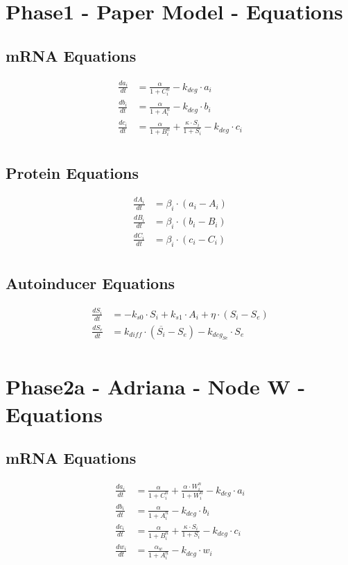 \documentclass[fleqn]{article}
\begin{document}
\section*{Phase1 - Paper Model - Equations}

\subsection*{mRNA Equations}
\begin{align*}
\frac{da_i}{dt} &= \frac{\alpha}{1 + C_i^n} - k_{deg} \cdot a_i \\
\frac{db_i}{dt} &= \frac{\alpha}{1 + A_i^n} - k_{deg} \cdot b_i \\
\frac{dc_i}{dt} &= \frac{\alpha}{1 + B_i^n} + \frac{\kappa \cdot S_i}{1 + S_i} - k_{deg} \cdot c_i \\
\end{align*}

\subsection*{Protein Equations}
\begin{align*}
\frac{dA_i}{dt} &= \beta_i \cdot (a_i - A_i) \\
\frac{dB_i}{dt} &= \beta_i \cdot (b_i - B_i) \\
\frac{dC_i}{dt} &= \beta_i \cdot (c_i - C_i) \\
\end{align*}

\subsection*{Autoinducer Equations}
\begin{align*}
\frac{dS_i}{dt} &= -k_{s0} \cdot S_i + k_{s1} \cdot A_i + \eta \cdot (S_i - S_e) \\
\frac{dS_e}{dt} &= k_{diff} \cdot (\overline{S_i} - S_e) - k_{deg_{Se}} \cdot S_e \\
\end{align*}

\pagebreak

\section*{Phase2a - Adriana - Node W - Equations}

\subsection*{mRNA Equations}
\begin{align*}
\frac{da_i}{dt} &= \frac{\alpha}{1 + C_i^n} +  \frac{\alpha \cdot W_i^n}{1 + W_i^n} - k_{deg} \cdot a_i \\
\frac{db_i}{dt} &= \frac{\alpha}{1 + A_i^n} - k_{deg} \cdot b_i \\
\frac{dc_i}{dt} &= \frac{\alpha}{1 + B_i^n} + \frac{\kappa \cdot S_i}{1 + S_i} - k_{deg} \cdot c_i \\
\frac{dw_i}{dt} &= \frac{\alpha_w}{1 + A_i^n} - k_{deg} \cdot w_i \\
\end{align*}
\end{document}
